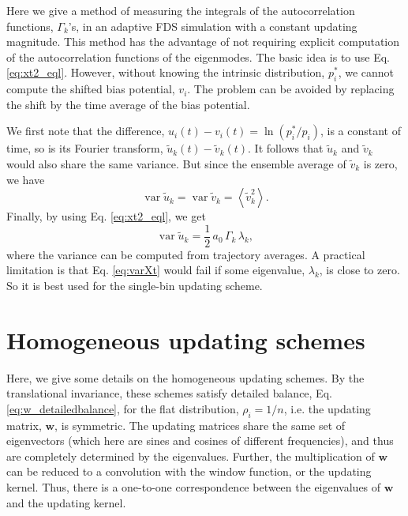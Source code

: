 \documentclass[reprint, superscriptaddress, floatfix]{revtex4-1}
\begin{document}
Here we give a method of measuring
the integrals of the autocorrelation functions, $\Gamma_k$'s,
in an adaptive FDS simulation
with a constant updating magnitude.
%
This method has the advantage of not requiring
explicit computation of 
the autocorrelation functions of the eigenmodes.
%
The basic idea is to use Eq. \eqref{eq:xt2_eql}.
%
However,
without knowing the intrinsic distribution, $p^*_i$,
we cannot compute the shifted bias potential, $v_i$.
%
The problem can be avoided by replacing the shift
by the time average of the bias potential.

We first note that the difference, 
$u_i(t) - v_i(t) = \ln(p^*_i/p_i)$, is a constant of time,
so is its Fourier transform,
$\tilde u_k(t) - \tilde v_k(t)$.
%
It follows that
${\tilde u}_{k}$ and ${\tilde v}_{k}$ would also share the same variance.
%
But since the ensemble average of ${\tilde v}_{k}$
is zero, we have
\begin{equation*}
  \operatorname{var} {\tilde u}_{k}
  =
  \operatorname{var} {\tilde v}_{k}
  =
  \left\langle {\tilde v}_{k}^2 \right\rangle
  .
\end{equation*}
%
Finally, by using Eq. \eqref{eq:xt2_eql},
we get
%
\begin{equation}
  \operatorname{var} {\tilde u}_k
  =
  \frac{1}{2} \,
  a_0 \, \Gamma_k \, \lambda_k,
\label{eq:varXt}
\end{equation}
%
where the variance can be computed from trajectory averages.
%
A practical limitation is that Eq. \eqref{eq:varXt}
would fail if some eigenvalue, $\lambda_k$, is close to zero.
So it is best used for the single-bin updating scheme.




\section{\label{sec:more_wband}
Homogeneous updating schemes
}


Here, we give some details
on the homogeneous updating schemes.
%
By the translational invariance,
these schemes
satisfy detailed balance,
Eq. \eqref{eq:w_detailedbalance},
for the flat distribution, $\rho_i = 1/n$,
i.e. the updating matrix, $\mathbf w$,
is symmetric.
%
The updating matrices
share the same set of eigenvectors
(which here are sines and cosines of different frequencies),
and thus are completely determined
by the eigenvalues.
%
Further, the multiplication of $\mathbf w$
can be reduced to a convolution with the window function,
or the updating kernel.
%
Thus,
there is a one-to-one correspondence between
the eigenvalues of $\mathbf w$
and the updating kernel.
\end{document}
